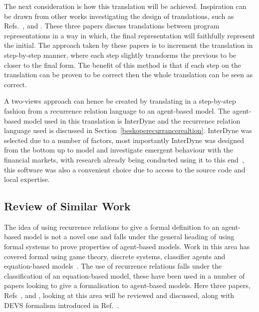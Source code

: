 \documentclass{article}
\begin{document}
The next consideration is how this translation will be achieved. Inspiration can be drawn from other works investigating the design of translations, such as Refs.~\cite{clovertrans},  \cite{transproggotmod} and  \cite{stepcorentconv}. These three papers discuss translations between program representations in a way in which, the final representation will faithfully represent the initial. The approach taken by these papers is to increment the translation in step-by-step manner, where each step slightly transforms the previous to be closer to the final form. The benefit of this method is that if each step on the translation can be proven to be correct then the whole translation can be seen as correct. 

A two-views approach can hence be created by translating in a step-by-step fashion from a recurrence relation language to an agent-based model. The agent-based model used in this translation is InterDyne and the recurrence relation language used is discussed in Section~\ref{beskoperecurrancerealtion}. InterDyne was selected due to a number of factors, most importantly InterDyne was designed from the bottom up to model and investigate emergent behaviour with the financial markets, with research already being conducted using it to this end~\cite{DynamicCoupling_Chris}, this software was also a convenient choice due to access to the source code and local expertise.

\subsection{Review of Similar Work}\label{simwork}
The idea of using recurrence relations to give a formal definition to an agent-based model is not a novel one and falls under the general heading of using formal systems to prove properties of agent-based models. Work in this area has covered formal using game theory, discrete systems, classifier agents and equation-based models~\cite{taabm}. The use of recurrence relations falls under the classification of an equation-based model, these have been used in a number of papers looking to give a formalisation to agent-based models. Here three papers, Refs~\cite{ebmabmi}, \cite{econmistsnoabm} and \cite{abmtsd}, looking at this area will be reviewed and discussed, along with DEVS formalism introduced in Ref.~\cite{introdevs}.
\end{document}
